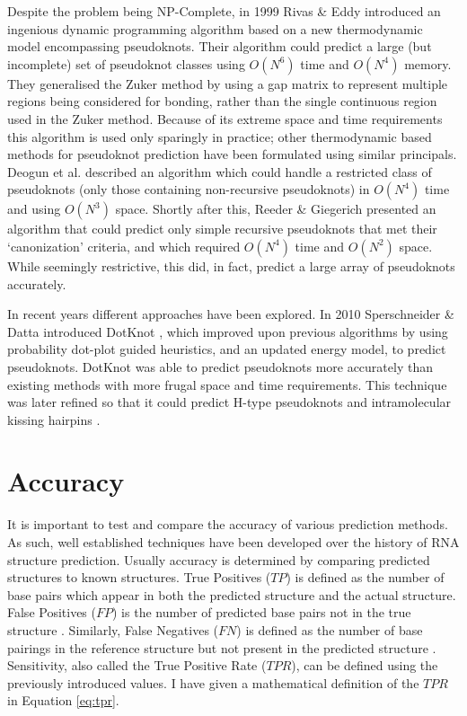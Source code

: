 \documentclass{cshonours}
\begin{document}
Despite the problem being NP-Complete, in 1999 Rivas \& Eddy \cite{rivas1999dynamic} introduced an ingenious dynamic
programming algorithm based on a new thermodynamic model encompassing pseudoknots. Their algorithm could predict a large (but incomplete) set of pseudoknot classes using
$O(N^6)$ time and $O(N^4)$ memory. They generalised the Zuker method by using a gap matrix to represent multiple regions being considered for bonding, rather than
the single continuous region used in the Zuker method. Because of its extreme
space and time requirements this algorithm is used only sparingly in practice; other thermodynamic based methods for pseudoknot prediction have
been formulated using similar principals. Deogun et al. \cite{deogun2004rna} described an algorithm which could handle a restricted class of pseudoknots (only those containing
non-recursive pseudoknots) in $O(N^4)$ time and using $O(N^3)$ space. Shortly after this, Reeder \& Giegerich \cite{reeder2004design} presented an algorithm that could predict
only simple recursive pseudoknots that met their `canonization' criteria, and which required $O(N^4)$ time and $O(N^2)$ space. While
seemingly restrictive, this did, in fact, predict a large array of pseudoknots accurately. 

In recent years different approaches have been explored. In 2010 Sperschneider \& Datta introduced DotKnot \cite{sperschneider2010dotknot}, which improved upon previous algorithms by using probability dot-plot guided heuristics, and an updated energy model, to predict pseudoknots. DotKnot was able to predict pseudoknots more accurately than existing methods with more frugal space and time requirements. This technique was later refined so that it could predict H-type pseudoknots and intramolecular kissing hairpins \cite{sperschneider2011heuristic}.


\section{Accuracy}
\label{sec:accuracy}
It is important to test and compare the accuracy of various prediction methods.
As such, well established techniques have been developed over
the history of RNA structure prediction. Usually accuracy is determined by comparing predicted structures to known
structures. True Positives ($TP$) is defined as the number of base pairs which appear in both the predicted structure and the actual structure. False Positives
($FP$) is the number of predicted base pairs not in the true
structure \cite{lorenz2011viennarna}. Similarly, False Negatives ($FN$) is defined as the number of base
pairings in the reference structure but not present in the predicted structure \cite{lorenz2011viennarna}.
Sensitivity, also called the True Positive Rate ($TPR$), can be defined using the previously introduced values. I have given a mathematical definition of the $TPR$ in Equation \ref{eq:tpr}.
\end{document}
